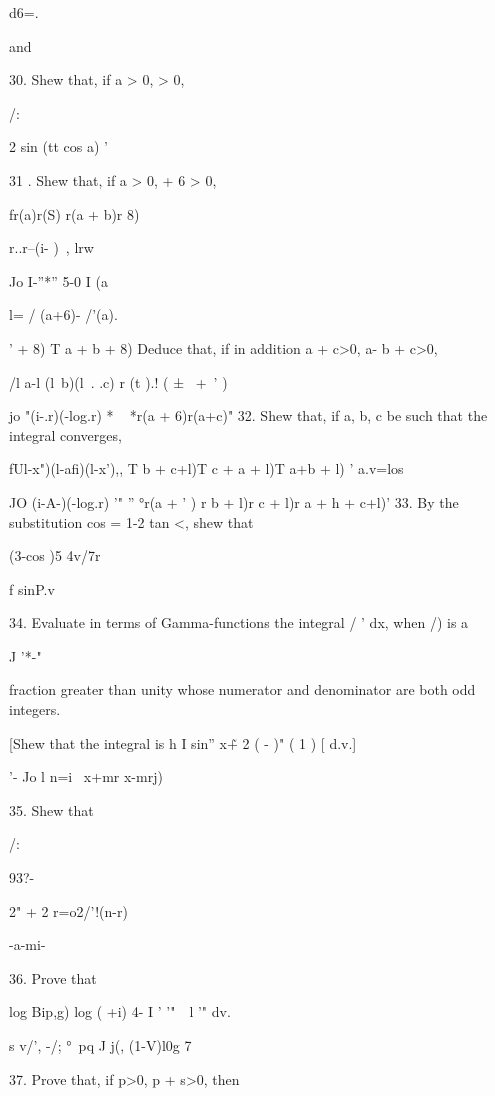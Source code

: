 d6=.

and

30. Shew that, if a > 0, > 0,

/:

2 sin (tt cos a) '



31 . Shew that, if a > 0, + 6 > 0,

fr(a)r(S) r(a + b)r 8)

r..r--(i- ) \,, lrw

Jo I-''*'' 5-0 I (a

l= / (a+6)- /'(a).

' + 8) T a + b + 8) Deduce that, if in addition a + c>0, a- b + c>0,

/l a-l (l\ b)(l\ . .c) r (t ).! ( ± \ +\ ' )

jo "(i-.r)(-log.r) * ~ *r(a + 6)r(a+c)" 32. Shew that, if a, b, c be
such that the integral converges,

fUl-x")(l-afi)(l-x'),, T b + c+l)T c + a + l)T a+b + l) ' a.v=los

JO (i-A-)(-log.r) '" '' °r(a + ' ) r b + l)r c + l)r a + h + c+l)' 33.
By the substitution cos = 1-2 tan <, shew that

(3-cos )5 4v/7r


f sinP.v

34. Evaluate in terms of Gamma-functions the integral / ' dx, when /)
is a

J '*-"

fraction greater than unity whose numerator and denominator are both
odd integers.

[Shew that the integral is h I sin'' x\~+ 2 ( - )" ( 1 ) [ d.v.]

'- Jo l n=i \ x+mr x-mrj)

35. Shew that


/:

93?-

2" + 2 r=o2/'!(n-r)

-a-mi-

36. Prove that

log Bip,g) log ( +i) 4- I ' \: '"\ \ l '" dv. 

s v/', -/; °\ pq J j(, (1-V)l0g 7

37. Prove that, if p>0, p + s>0, then

